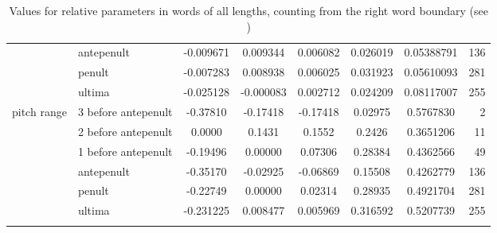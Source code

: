 \documentclass[output=paper]{LSP/langsci}
\begin{document}
\begin{table}
\begin{tabular}{ll *{5}{S[table-format=1.8,group-digits=false]}r}
                                                                & antepenult                & -0.009671      & 0.009344   & 0.006082   & 0.026019       & 0.05388791 & 136                          \\
                                                                & penult                    & -0.007283      & 0.008938   & 0.006025   & 0.031923       & 0.05610093 & 281                          \\
                                                                & ultima                    & -0.025128      & -0.000083  & 0.002712   & 0.024209       & 0.08117007 & 255                          \\
\midrule
pitch range                                                     & 3 before antepenult       & -0.37810       & -0.17418   & -0.17418   & 0.02975        & 0.5767830  & 2                            \\
                                                                & 2 before antepenult       & 0.0000         & 0.1431     & 0.1552     & 0.2426         & 0.3651206  & 11                           \\
                                                                & 1 before antepenult       & -0.19496       & 0.00000    & 0.07306    & 0.28384        & 0.4362566  & 49                           \\
                                                                & antepenult                & -0.35170       & -0.02925   & -0.06869   & 0.15508        & 0.4262779  & 136                          \\
                                                                & penult                    & -0.22749       & 0.00000    & 0.02314    & 0.28935        & 0.4921704  & 281                          \\
                                                                & ultima                    & -0.231225      & 0.008477   & 0.005969   & 0.316592       & 0.5207739  & 255                         \\
\lspbottomrule
\end{tabular}
\caption{Values for relative parameters in words of all lengths, counting from the right word boundary (see )}
\label{tab:buc:1}
\end{table}
\end{document}
